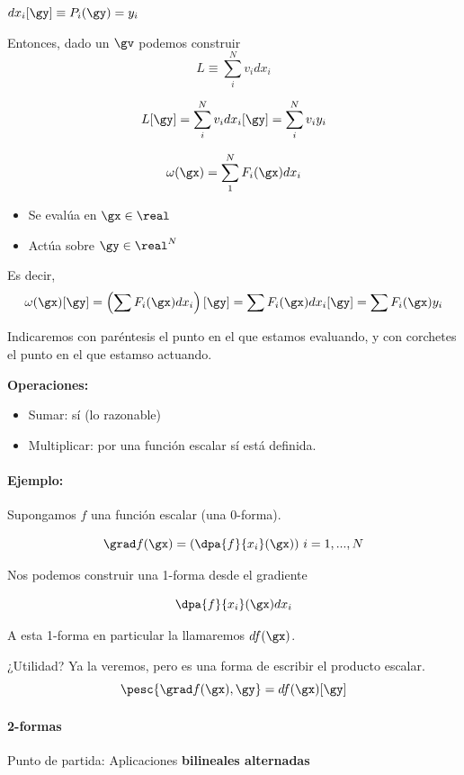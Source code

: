 $dx_i[\gy] \equiv P_i(\gy) = y_i$

Entonces, dado un $\gv$ podemos construir 
\[L \equiv \sum_i^N v_idx_i\]

\[L[\gy] = \sum_i^N v_idx_i[\gy] = \sum_i^N v_iy_i\]

\begin{defn}[1-forma]
\[\omega(\gx)= \sum_1^N F_i(\gx) dx_i\]

\begin{itemize}
\item Se evalúa en $\gx\in\real$
\item Actúa sobre $\gy\in\real^N$ 
\end{itemize}

Es decir, \[\omega(\gx)[\gy] = \left(\sum F_i(\gx)dx_i\right)[\gy] = \sum F_i(\gx)dx_i[\gy] = \sum F_i(\gx)y_i\]
\end{defn}

Indicaremos con paréntesis el punto en el que estamos evaluando, y con corchetes el punto en el que estamso actuando.

\textbf{Operaciones:}
\begin{itemize}
\item Sumar: sí (lo razonable)
\item Multiplicar: por una función escalar sí está definida.
\end{itemize}


\paragraph{Ejemplo:}

Supongamos $f$ una función escalar (una 0-forma).

\[\grad f(\gx) = \left( \dpa{f}{x_i}(\gx)\right)\, i=1,...,N\]

Nos podemos construir una 1-forma desde el gradiente

\[\dpa{f}{x_i}(\gx)dx_i \]

A esta 1-forma en particular la llamaremos $df(\gx)$.

¿Utilidad? Ya la veremos, pero es una forma de escribir el producto escalar.
\[\pesc{\grad f(\gx),\gy} = df(\gx)[\gy]\]


\paragraph{2-formas}

Punto de partida: Aplicaciones \textbf{bilineales alternadas}

